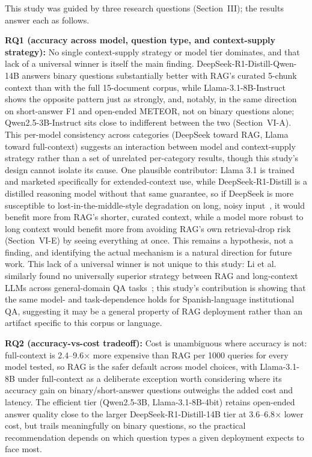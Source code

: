 \documentclass[conference]{IEEEtran}
\begin{document}
This study was guided by three research questions (Section~III); the results answer each as follows.

\textbf{RQ1 (accuracy across model, question type, and context-supply strategy):}
No single context-supply strategy or model tier dominates, and that lack of a universal winner is itself the main finding.
DeepSeek-R1-Distill-Qwen-14B answers binary questions substantially better with RAG's curated 5-chunk context than with the full 15-document corpus, while Llama-3.1-8B-Instruct shows the opposite pattern just as strongly, and, notably, in the same direction on short-answer F1 and open-ended METEOR, not on binary questions alone; Qwen2.5-3B-Instruct sits close to indifferent between the two (Section~VI-A).
This per-model consistency across categories (DeepSeek toward RAG, Llama toward full-context) suggests an interaction between model and context-supply strategy rather than a set of unrelated per-category results, though this study's design cannot isolate its cause.
One plausible contributor: Llama 3.1 is trained and marketed specifically for extended-context use, while DeepSeek-R1-Distill is a distilled reasoning model without that same guarantee, so if DeepSeek is more susceptible to lost-in-the-middle-style degradation on long, noisy input~\cite{liu2024lostinthemiddle}, it would benefit more from RAG's shorter, curated context, while a model more robust to long context would benefit more from avoiding RAG's own retrieval-drop risk (Section~VI-E) by seeing everything at once.
This remains a hypothesis, not a finding, and identifying the actual mechanism is a natural direction for future work.
This lack of a universal winner is not unique to this study: Li et al. similarly found no universally superior strategy between RAG and long-context LLMs across general-domain QA tasks~\cite{li2025lara}; this study's contribution is showing that the same model- and task-dependence holds for Spanish-language institutional QA, suggesting it may be a general property of RAG deployment rather than an artifact specific to this corpus or language.

\textbf{RQ2 (accuracy-vs-cost tradeoff):}
Cost is unambiguous where accuracy is not: full-context is 2.4--9.6$\times$ more expensive than RAG per 1000 queries for every model tested, so RAG is the safer default across model choices, with Llama-3.1-8B under full-context as a deliberate exception worth considering where its accuracy gain on binary/short-answer questions outweighs the added cost and latency.
The efficient tier (Qwen2.5-3B, Llama-3.1-8B-4bit) retains open-ended answer quality close to the larger DeepSeek-R1-Distill-14B tier at 3.6--6.8$\times$ lower cost, but trails meaningfully on binary questions, so the practical recommendation depends on which question types a given deployment expects to face most.
\end{document}
